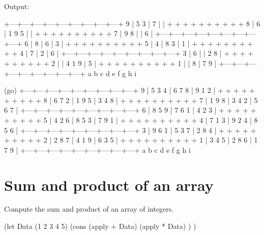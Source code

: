 \begin{itemize}
\begin{wideverbatim}
\end{wideverbatim}

\begin{wideverbatim}


Output:

   +---+---+---+---+---+---+---+---+---+
 9 | 5   3     |     7     |           |
   +   +   +   +   +   +   +   +   +   +
 8 | 6         | 1   9   5 |           |
   +   +   +   +   +   +   +   +   +   +
 7 |     9   8 |           |     6     |
   +---+---+---+---+---+---+---+---+---+
 6 | 8         |     6     |         3 |
   +   +   +   +   +   +   +   +   +   +
 5 | 4         | 8       3 |         1 |
   +   +   +   +   +   +   +   +   +   +
 4 | 7         |     2     |         6 |
   +---+---+---+---+---+---+---+---+---+
 3 |     6     |           | 2   8     |
   +   +   +   +   +   +   +   +   +   +
 2 |           | 4   1   9 |         5 |
   +   +   +   +   +   +   +   +   +   +
 1 |           |     8     |     7   9 |
   +---+---+---+---+---+---+---+---+---+
     a   b   c   d   e   f   g   h   i

(go)
   +---+---+---+---+---+---+---+---+---+
 9 | 5   3   4 | 6   7   8 | 9   1   2 |
   +   +   +   +   +   +   +   +   +   +
 8 | 6   7   2 | 1   9   5 | 3   4   8 |
   +   +   +   +   +   +   +   +   +   +
 7 | 1   9   8 | 3   4   2 | 5   6   7 |
   +---+---+---+---+---+---+---+---+---+
 6 | 8   5   9 | 7   6   1 | 4   2   3 |
   +   +   +   +   +   +   +   +   +   +
 5 | 4   2   6 | 8   5   3 | 7   9   1 |
   +   +   +   +   +   +   +   +   +   +
 4 | 7   1   3 | 9   2   4 | 8   5   6 |
   +---+---+---+---+---+---+---+---+---+
 3 | 9   6   1 | 5   3   7 | 2   8   4 |
   +   +   +   +   +   +   +   +   +   +
 2 | 2   8   7 | 4   1   9 | 6   3   5 |
   +   +   +   +   +   +   +   +   +   +
 1 | 3   4   5 | 2   8   6 | 1   7   9 |
   +---+---+---+---+---+---+---+---+---+
     a   b   c   d   e   f   g   h   i

\end{wideverbatim}

\pagebreak{}
\section*{Sum and product of an array}

Compute the sum and product of an array of integers.

\begin{wideverbatim}

(let Data (1 2 3 4 5)
   (cons
      (apply + Data)
      (apply * Data) ) )


\end{wideverbatim}
\end{itemize}
